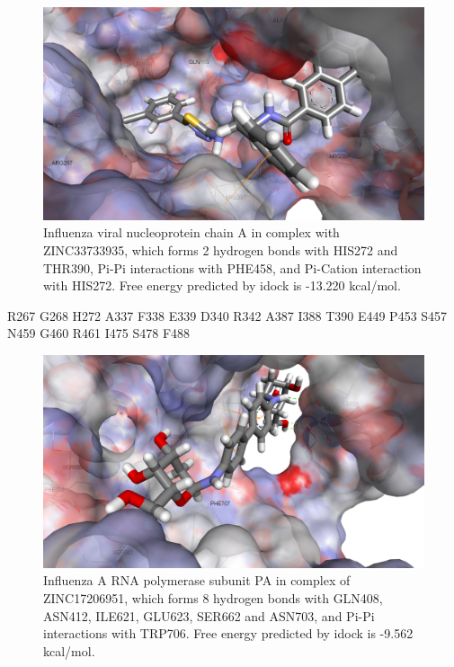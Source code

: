 \begin{figure}
\centering
\includegraphics[width=\linewidth]{../influenza/2IQH-ZINC33733935.png}
\caption{Influenza viral nucleoprotein chain A in complex with ZINC33733935, which forms 2 hydrogen bonds with HIS272 and THR390, Pi-Pi interactions with PHE458, and Pi-Cation interaction with HIS272. Free energy predicted by idock is -13.220 kcal/mol.}
\label{influenza:2IQH-ZINC33733935}
\end{figure}

R267
G268
H272
A337
F338
E339
D340
R342
A387
I388
T390
E449
P453
S457
N459
G460
R461
I475
S478
F488

\begin{figure}
\centering
\includegraphics[width=\linewidth]{../influenza/2ZNL-ZINC17206951.png}
\caption{Influenza A RNA polymerase subunit PA in complex of ZINC17206951, which forms 8 hydrogen bonds with GLN408, ASN412, ILE621, GLU623, SER662 and ASN703, and Pi-Pi interactions with TRP706. Free energy predicted by idock is -9.562 kcal/mol.}
\label{influenza:2ZNL-ZINC17206951}
\end{figure}


